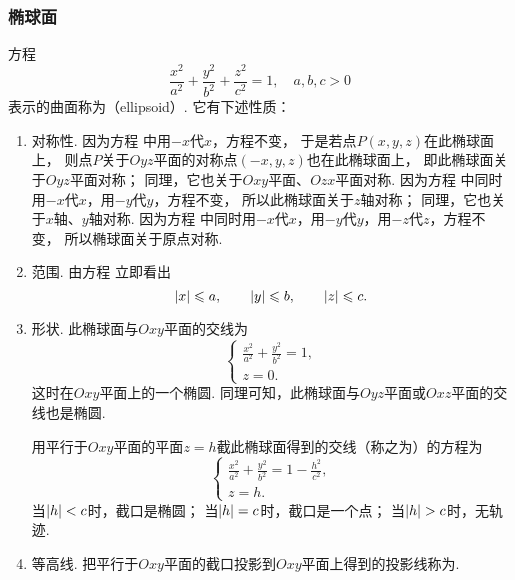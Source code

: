 \subsubsection{椭球面}
方程\begin{equation}\label{equation:解析几何.椭球面的一般方程}
	\frac{x^2}{a^2}+\frac{y^2}{b^2}+\frac{z^2}{c^2}=1,
	\quad a,b,c>0
\end{equation}
表示的曲面称为（ellipsoid）.
它有下述性质：
\begin{enumerate}
	\item 对称性.
	因为方程  中用\(-x\)代\(x\)，方程不变，
	于是若点\(P(x,y,z)\)在此椭球面上，
	则点\(P\)关于\(Oyz\)平面的对称点\((-x,y,z)\)也在此椭球面上，
	即此椭球面关于\(Oyz\)平面对称；
	同理，它也关于\(Oxy\)平面、\(Ozx\)平面对称.
	因为方程  中同时用\(-x\)代\(x\)，用\(-y\)代\(y\)，方程不变，
	所以此椭球面关于\(z\)轴对称；
	同理，它也关于\(x\)轴、\(y\)轴对称.
	因为方程  中同时用\(-x\)代\(x\)，用\(-y\)代\(y\)，用\(-z\)代\(z\)，方程不变，
	所以椭球面关于原点对称.

	\item 范围.
	由方程  立即看出\[
		\abs{x} \leqslant a, \qquad
		\abs{y} \leqslant b, \qquad
		\abs{z} \leqslant c.
	\]

	\item 形状.
	此椭球面与\(Oxy\)平面的交线为\[
		\left\{ \begin{array}{l}
			\frac{x^2}{a^2}+\frac{y^2}{b^2}=1, \\
			z = 0.
		\end{array} \right.
	\]
	这时在\(Oxy\)平面上的一个椭圆.
	同理可知，此椭球面与\(Oyz\)平面或\(Oxz\)平面的交线也是椭圆.

	用平行于\(Oxy\)平面的平面\(z = h\)截此椭球面得到的交线（称之为）的方程为\[
		\left\{ \begin{array}{l}
			\frac{x^2}{a^2}+\frac{y^2}{b^2}=1-\frac{h^2}{c^2}, \\
			z = h.
		\end{array} \right.
	\]
	当\(\abs{h} < c\)时，截口是椭圆；
	当\(\abs{h} = c\)时，截口是一个点；
	当\(\abs{h} > c\)时，无轨迹.

	\item 等高线.
	把平行于\(Oxy\)平面的截口投影到\(Oxy\)平面上得到的投影线称为.
\end{enumerate}

